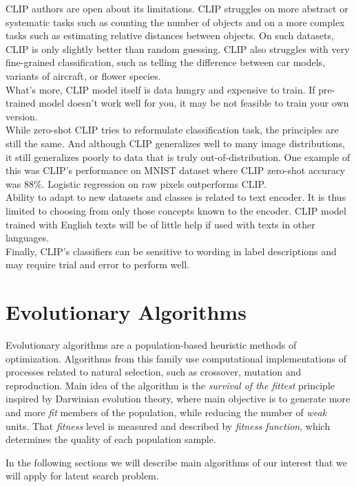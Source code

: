 \documentclass[12pt,a4paper,openany]{book}
\begin{document}
\noindent CLIP authors are open about its limitations. CLIP struggles on more abstract or systematic tasks such as counting the number of objects and on a more complex tasks such as estimating relative distances between objects. On such datasets, CLIP is only slightly better than random guessing. CLIP also struggles with very fine-grained classification, such as telling the difference between car models, variants of aircraft, or flower species.\\
\noindent What's more,  CLIP model itself is data hungry and expensive to train. If pre-trained model doesn’t work well for you, it may be not feasible to train your own version.\\
\noindent While zero-shot CLIP tries to reformulate classification task, the principles are still the same. And although CLIP generalizes well to many image distributions, it still generalizes poorly to data that is truly out-of-distribution. One example of this was CLIP’s performance on MNIST dataset where CLIP zero-shot accuracy was $88 \%.$ Logistic regression on raw pixels outperforms CLIP.\\
\noindent Ability to adapt to new datasets and classes is related to text encoder. It is thus limited to choosing from only those concepts known to the encoder. CLIP model trained with English texts will be of little help if used with texts in other languages. \\
\noindent Finally, CLIP’s classifiers can be sensitive to wording in label descriptions and may require trial and error to perform well.
\newpage
\section{Evolutionary Algorithms}

Evolutionary algorithms are a population-based heuristic methods of optimization. Algorithms from this family use computational implementations of processes related to natural selection, such as crossover, mutation and reproduction. Main idea of the algorithm is the \textit{survival of the fittest} principle inspired by Darwinian evolution theory, where main objective is to generate more and more \textit{fit} members of the population, while reducing the number of \textit{weak} units. That \textit{fitness} level is measured and described by \textit{fitness function}, which determines the quality of each population sample.

In the following sections we will describe main algorithms of our interest that we will apply for latent search problem. 
\end{document}
